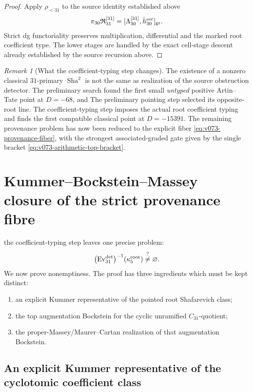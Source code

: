 \documentclass[11pt]{article}
\theoremstyle{remark}
\newtheorem{remark}[theorem]{Remark}
\providecommand{\Sha}{\operatorname{Sha}}
\begin{document}
\begin{proof}
Apply \(\rho_{<31}\) to the source identity established above
\[
 \pi_{30}\mathfrak R_{31}^{[31]}
 =
 [\Lambda_{30}^{[31]},\bar h_{30}^{\rm rec}]_{\rm gr}.
\]
Strict dg functoriality preserves multiplication, differential and the
marked root coefficient type.  The lower stages are handled by the exact
cell-stage descent already established by the source recursion above.
\end{proof}

\begin{remark}[What the coefficient-typing step changes]
\label{rem:v073-change}
The existence of a nonzero classical \(31\)-primary \(\Sha^2\) is not the
same as realization of the source obstruction detector.  The preliminary search found the
first small \emph{untyped} positive Artin--Tate point at \(D=-68\), and
The preliminary pointing step selected its opposite-root line.  The coefficient-typing step imposes the
actual root coefficient typing and finds the first compatible classical
point at \(D=-15391\).  The remaining provenance problem has now been
reduced to the explicit fiber
\eqref{eq:v073-provenance-fiber}, with the strongest associated-graded gate
given by the single bracket
\eqref{eq:v073-arithmetic-top-bracket}.
\end{remark}



\section{Kummer--Bockstein--Massey closure of the strict provenance fibre}
\label{sec:v074-kummer-bockstein-massey}

the coefficient-typing step leaves one precise problem:
\[
 \bigl(\operatorname{Ev}_{31}^{\det}\bigr)^{-1}
 (\kappa_5^{\rm root})
 \stackrel{?}{\ne}\varnothing.
\]
We now prove nonemptiness.  The proof has three ingredients which must be
kept distinct:
\begin{enumerate}[label=\textup{(\roman*)}]
\item an explicit Kummer representative of the pointed root
      Shafarevich class;
\item the top augmentation Bockstein for the cyclic unramified
      \(C_{31}\)-quotient;
\item the proper-Massey/Maurer--Cartan realization of that augmentation
      Bockstein.
\end{enumerate}

\subsection{An explicit Kummer representative of the cyclotomic coefficient class}
\end{document}
